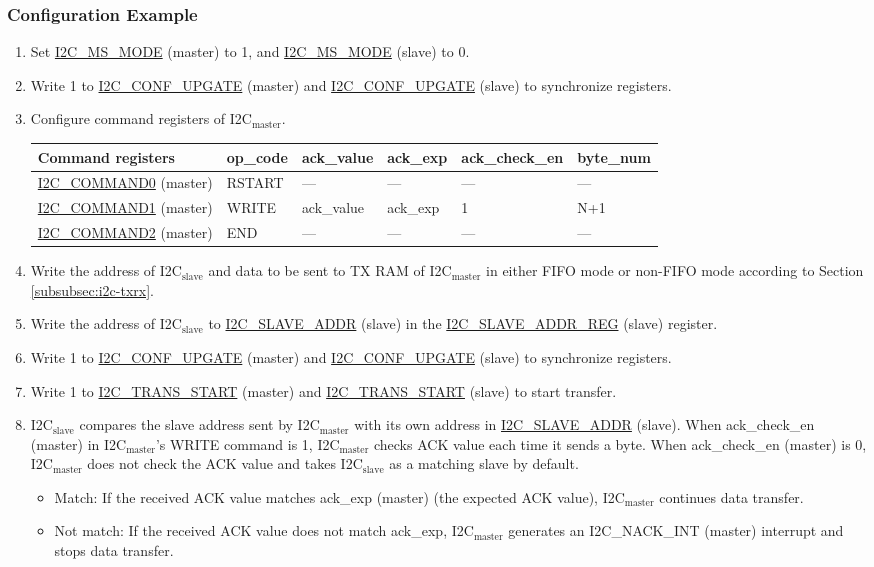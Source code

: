 \documentclass[main\_\_EN.tex]{subfiles}
\begin{document}
\subsubsection{Configuration Example}
\begin{enumerate}
\item Set \hyperref[fielddesc:I2CMSMODE]{I2C\_MS\_MODE} (master) to 1, and \hyperref[fielddesc:I2CMSMODE]{I2C\_MS\_MODE} (slave) to 0.
\item Write 1 to \hyperref[fielddesc:I2CCONFUPGATE]{I2C\_CONF\_UPGATE} (master) and \hyperref[fielddesc:I2CCONFUPGATE]{I2C\_CONF\_UPGATE} (slave) to synchronize registers.
\item Configure command registers of I2C$_\text{master}$.
\begin{longtable}{ | p{4cm} | p{2cm} | p{2cm} | p{2cm} |p{2cm} | p{2cm} |}
\hline\rowcolor{lightgray}
Command registers& op\_code & ack\_value&ack\_exp&ack\_check\_en&byte\_num  \\ \hline
\hyperref[fielddesc:I2CCOMMAND0]{I2C\_COMMAND0} (master)& RSTART& ---&---&---&---  \\ \hline
\hyperref[fielddesc:I2CCOMMAND1]{I2C\_COMMAND1} (master)& WRITE& ack\_value&ack\_exp&1&N+1  \\ \hline
\hyperref[fielddesc:I2CCOMMAND2]{I2C\_COMMAND2} (master)& END& ---&---&---&---  \\ \hline
\end{longtable}
\item Write the address of I2C$_\text{slave}$ and data to be sent to TX RAM of I2C$_\text{master}$ in either FIFO mode or non-FIFO mode according to Section \ref{subsubsec:i2c-txrx}.
\item Write the address of I2C$_\text{slave}$ to \hyperref[fielddesc:I2CSLAVEADDR]{I2C\_SLAVE\_ADDR} (slave) in the \hyperref[regdesc:I2CSLAVEADDRREG]{I2C\_SLAVE\_ADDR\_REG} (slave) register.
\item Write 1 to \hyperref[fielddesc:I2CCONFUPGATE]{I2C\_CONF\_UPGATE} (master) and \hyperref[fielddesc:I2CCONFUPGATE]{I2C\_CONF\_UPGATE} (slave) to synchronize registers.
\item Write 1 to \hyperref[fielddesc:I2CTRANSSTART]{I2C\_TRANS\_START} (master) and \hyperref[fielddesc:I2CTRANSSTART]{I2C\_TRANS\_START} (slave) to start transfer.
\item I2C$_\text{slave}$ compares the slave address sent by I2C$_\text{master}$ with its own address in \hyperref[fielddesc:I2CSLAVEADDR]{I2C\_SLAVE\_ADDR} (slave). When ack\_check\_en (master) in I2C$_\text{master}$'s WRITE command is 1, I2C$_\text{master}$ checks ACK value each time it sends a byte. When ack\_check\_en (master) is 0, I2C$_\text{master}$ does not check the ACK value and takes I2C$_\text{slave}$ as a matching slave by default.
\begin{itemize}
\item Match: If the received ACK value matches ack\_exp (master) (the expected ACK value), I2C$_\text{master}$ continues data transfer.
\item Not match: If the received ACK value does not match ack\_exp, I2C$_\text{master}$ generates an I2C\_NACK\_INT (master) interrupt and stops data transfer.
\end{itemize}


\end{enumerate}
\end{document}
